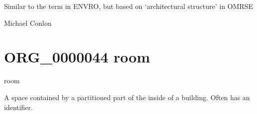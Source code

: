 \documentclass[letterpaper,10pt,english]{sphinxmanual}
\begin{document}
\begin{sphinxShadowBox}

\sphinxAtStartPar
Similar to the term in ENVRO, but based on ‘architectural structure’ in OMRSE
\end{sphinxShadowBox}

\begin{sphinxShadowBox}

\sphinxAtStartPar
Michael Conlon 
\end{sphinxShadowBox}

\begin{sphinxShadowBox}

\sphinxAtStartPar
{}
\end{sphinxShadowBox}
\begin{quote}
\label{\detokenize{doc-ORG_0000044:org-0000044}}\label{\detokenize{doc-ORG_0000044:room}}\label{\detokenize{doc-ORG_0000044:org-0000044}}
\ignorespaces \end{quote}


\section{ORG\_0000044 \sphinxhyphen{} room}
\label{\detokenize{doc-ORG_0000044:org-0000044-room}}\label{\detokenize{doc-ORG_0000044:index-0}}\label{\detokenize{doc-ORG_0000044::doc}}
\begin{sphinxShadowBox}

\sphinxAtStartPar
room
\end{sphinxShadowBox}

\begin{sphinxShadowBox}

\sphinxAtStartPar
A space contained by a partitioned part of the inside of a building.  Often has an identifier.
\end{sphinxShadowBox}

\begin{sphinxShadowBox}

\sphinxAtStartPar
{}
\end{sphinxShadowBox}
\end{document}
